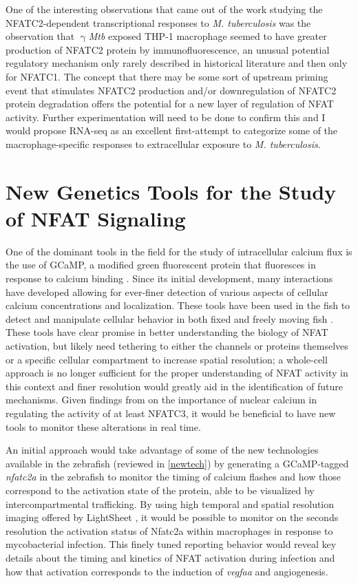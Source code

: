 One of the interesting observations that came out of the work studying the NFATC2-dependent transcriptional responses to \textit{M. tuberculosis} was the observation that $\upgamma$\textit{Mtb} exposed THP-1 macrophage seemed to have greater production of NFATC2 protein by immunofluorescence, an unusual potential regulatory mechanism only rarely described in historical literature \citep{Asagiri2005, Aramburu1995} and then only for NFATC1. The concept that there may be some sort of upstream priming event that stimulates NFATC2 production and/or downregulation of NFATC2 protein degradation offers the potential for a new layer of regulation of NFAT activity. Further experimentation will need to be done to confirm this and I would propose RNA-seq as an excellent first-attempt to categorize some of the macrophage-specific responses to extracellular exposure to \textit{M. tuberculosis}. 

\section{New Genetics Tools for the Study of NFAT Signaling}

One of the dominant tools in the field for the study of intracellular calcium flux is the use of GCaMP, a modified green fluorescent protein that fluoresces in response to calcium binding \citep{Nakai2001}. Since its initial development, many interactions have developed allowing for ever-finer detection of various aspects of cellular calcium concentrations and localization. These tools have been used in the fish to detect and manipulate cellular behavior in both fixed and freely moving fish \citep{Beerman2015, Kim2017}. These tools have clear promise in better understanding the biology of NFAT activation, but likely need tethering to either the channels or proteins themselves or a specific cellular compartment to increase spatial resolution; a whole-cell approach is no longer sufficient for the proper understanding of NFAT activity in this context and finer resolution would greatly aid in the identification of future mechanisms. Given findings from \citet{Kar2015} on the importance of nuclear calcium in regulating the activity of at least NFATC3, it would be beneficial to have new tools to monitor these alterations in real time. 

An initial approach would take advantage of some of the new technologies available in the zebrafish (reviewed in \autoref{newtech}) by generating a GCaMP-tagged \textit{nfatc2a} in the zebrafish to monitor the timing of calcium flashes and how those correspond to the activation state of the protein, able to be visualized by intercompartmental trafficking. By using high temporal and spatial resolution imaging offered by LightSheet \citep{Reynaud2008}, it would be possible to monitor on the seconds resolution the activation status of Nfatc2a within macrophages in response to mycobacterial infection. This finely tuned reporting behavior would reveal key details about the timing and kinetics of NFAT activation during infection and how that activation corresponds to the induction of \textit{vegfaa} and angiogenesis.



